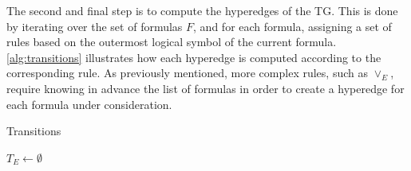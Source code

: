 The second and final step is to compute the hyperedges of the \gls{TG}. This is done by iterating over the set of formulas \(F\), and for each formula, assigning a set of rules based on the outermost logical symbol of the current formula. \autoref{alg:transitions} illustrates how each hyperedge is computed according to the corresponding rule. As previously mentioned, more complex rules, such as \(\vee_E\), require knowing in advance the list of formulas in order to create a hyperedge for each formula under consideration.

\begin{algorithm}[h]
\caption{Transitions}
\label{alg:transitions}

$T_E \leftarrow \emptyset$

\end{algorithm}

